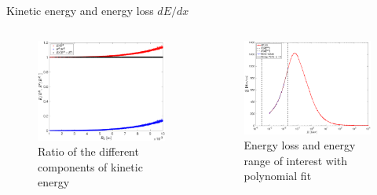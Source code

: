 \documentclass[aspectratio=169,xcolor=dvipsnames,8pt]{beamer}
\begin{document}


\begin{frame}{Kinetic energy and energy loss $dE/dx$}
     \begin{columns}[c] %

		\begin{figure}[h!]
		\includegraphics[width=1.1 \textwidth]{ER_11.eps}
		\caption{\label{config} Ratio of the different components of kinetic energy}
		\end{figure}

		\begin{figure}[h!]
		\includegraphics[width=1.1 \textwidth]{ElossFit3AllPts.eps}
		\caption{\label{config}Energy loss and energy range of interest with polynomial fit}
		\end{figure}
     \end{columns}
\end{frame}
\end{document}
